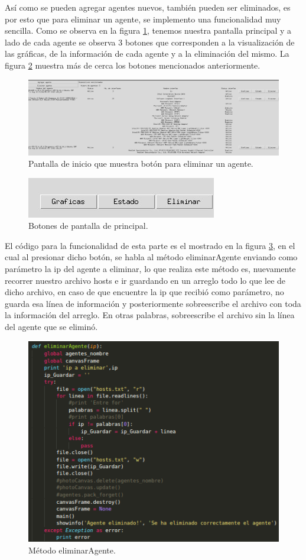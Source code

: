 Así como se pueden agregar agentes nuevos, también pueden ser eliminados, es por esto que para eliminar un agente, se implemento una funcionalidad muy sencilla. Como se observa en la figura \ref{image:eliminarCompleto}, tenemos nuestra pantalla principal y a lado de cada agente se observa 3 botones que corresponden a la visualización de las gráficas, de la información de cada agente y a la eliminación del mismo. La figura \ref{image:botones} muestra más de cerca los botones mencionados anteriormente.

\FloatBarrier
\begin{figure}[htbp!]
		\centering
	\includegraphics[width=1.1 \textwidth]{images/eliminarCompleto}
		\caption{Pantalla de inicio que muestra botón para eliminar un agente.}		\label{image:eliminarCompleto}
\end{figure}
\FloatBarrier

\FloatBarrier
\begin{figure}[htbp!]
		\centering
	\includegraphics[width=.3 \textwidth]{images/botones}
		\caption{Botones de pantalla de principal.}		\label{image:botones}
\end{figure}
\FloatBarrier

El código para la funcionalidad de esta parte es el mostrado en la figura \ref{image:eliminar}, en el cual al presionar dicho botón, se habla al método eliminarAgente enviando como parámetro la ip del agente a eliminar, lo que realiza este método es, nuevamente recorrer nuestro archivo hosts e ir guardando en un arreglo todo lo que lee de dicho archivo, en caso de que encuentre la ip que recibió como parámetro, no guarda esa línea de información y posteriormente sobreescribe el archivo con toda la información del arreglo. En otras palabras, sobreescribe el archivo sin la línea del agente que se eliminó.
\FloatBarrier
\begin{figure}[htbp!]
		\centering
	\includegraphics[width=.5 \textwidth]{images/eliminar}
		\caption{Método eliminarAgente.}		\label{image:eliminar}
\end{figure}
\FloatBarrier

